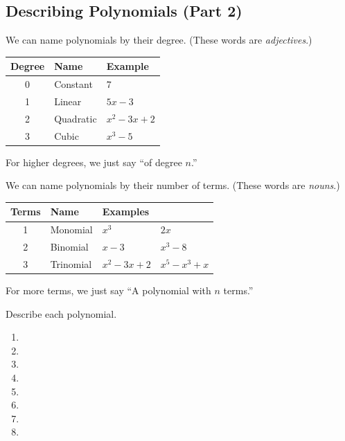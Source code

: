 \subsection{Describing Polynomials (Part 2)} 
\begin{definition}
We can name polynomials by their degree. (These words are \emph{adjectives}.)
\begin{center}
\begin{tabularx}{0.75\linewidth}{c@{\qquad}XX}
\textbf{Degree}&\textbf{Name}&\textbf{Example}\\\hline
0&Constant&$7$\\
1&Linear&$5x-3$\\
2&Quadratic&$x^2-3x+2$\\
3&Cubic&$x^3-5$
\end{tabularx}
\end{center}
\noindent For higher degrees, we just say ``of degree $n$.''
\end{definition}
\begin{definition}
We can name polynomials by their number of terms. (These words are \emph{nouns}.)
\begin{center}
\begin{tabularx}{0.75\linewidth}{c@{\qquad}XXX}
\textbf{Terms}&\textbf{Name}&\multicolumn{2}{l}{\textbf{Examples}}\\\hline
1&Monomial&$x^3$&$2x$\\
2&Binomial&$x-3$&$x^3-8$\\
3&Trinomial&$x^2-3x+2$&$x^5-x^3+x$
\end{tabularx}
\end{center}
\noindent For more terms, we just say ``A polynomial with $n$ terms.''
\end{definition}
\begin{Example}Describe each polynomial.
\begin{enumerate}\setabc
\item {}
\item {}
\item {}
\item {}
\item {}
\item {}
\item {}
\item {}
\end{enumerate}
\end{Example}